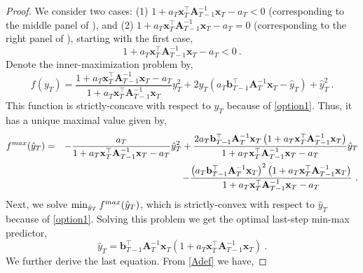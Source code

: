 \begin{proof}
We consider two cases:  (1)
$1+a_{T}\mathbf{x}_{T}^{\top}\mathbf{A}_{T-1}^{-1}\mathbf{x}_{T}-a_{T}<0$
(corresponding to the middle panel of ),
and (2)
$1+a_{T}\mathbf{x}_{T}^{\top}\mathbf{A}_{T-1}^{-1}\mathbf{x}_{T}-a_{T}=0$
(corresponding to the right panel of ),
starting with the first case,
\begin{equation}
1+a_{T}\mathbf{x}_{T}^{\top}\mathbf{A}_{T-1}^{-1}\mathbf{x}_{T}-a_{T}<0\label{option1}~.
\end{equation}
Denote the inner-maximization problem by,
\[
f\left(y_{T}\right)\!=\!\frac{1+a_{T}\mathbf{x}_{T}^{\top}\mathbf{A}_{T-1}^{-1}\mathbf{x}_{T}-a_{T}}{1+a_{T}\mathbf{x}_{T}^{\top}\mathbf{A}_{T-1}^{-1}\mathbf{x}_{T}}y_{T}^{2}+2y_{T}\left(a_{T}\mathbf{b}_{T-1}^{\top}\mathbf{A}_{T}^{-1}\mathbf{x}_{T}-\hat{y}_{T}\right)+\hat{y}_{T}^{2}~. 
\]
This function is strictly-concave with respect to $y_{T}$ because of
\eqref{option1}. Thus, it has a unique maximal value given by,
\begin{eqnarray*}
f^{max}(\hat{y}_{T})
 & = & -\frac{a_{T}}{1+a_{T}\mathbf{x}_{T}^{\top}\mathbf{A}_{T-1}^{-1}\mathbf{x}_{T}-a_{T}}\hat{y}_{T}^{2}+\frac{2a_{T}\mathbf{b}_{T-1}^{\top}\mathbf{A}_{T}^{-1}\mathbf{x}_{T}\left(1+a_{T}\mathbf{x}_{T}^{\top}\mathbf{A}_{T-1}^{-1}\mathbf{x}_{T}\right)}{1+a_{T}\mathbf{x}_{T}^{\top}\mathbf{A}_{T-1}^{-1}\mathbf{x}_{T}-a_{T}}\hat{y}_{T}\\
 &  & -\frac{\left(a_{T}\mathbf{b}_{T-1}^{\top}\mathbf{A}_{T}^{-1}\mathbf{x}_{T}\right)^{2}\left(1+a_{T}\mathbf{x}_{T}^{\top}\mathbf{A}_{T-1}^{-1}\mathbf{x}_{T}\right)}{1+a_{T}\mathbf{x}_{T}^{\top}\mathbf{A}_{T-1}^{-1}\mathbf{x}_{T}-a_{T}}~.
\end{eqnarray*}
Next, we solve $\min_{\hat{y}_{T}} f^{max}( \hat{y}_{T} )$, which is strictly-convex
with respect to $\hat{y}_{T}$ because of \eqref{option1}. Solving this problem we get the optimal
last-step min-max predictor,
\begin{equation}
\hat{y}_{T}=\mathbf{b}_{T-1}^{\top}\mathbf{A}_{T}^{-1}\mathbf{x}_{T}\left(1+a_{T}\mathbf{x}_{T}^{\top}\mathbf{A}_{T-1}^{-1}\mathbf{x}_{T}\right)
~.
\label{t1}
\end{equation}
We further derive the last equation. From \eqref{Adef} we have,

\end{proof}
